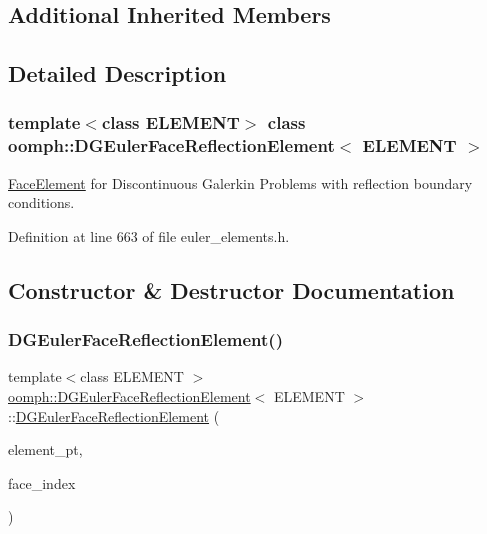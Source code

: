 \subsection*{Additional Inherited Members}


\subsection{Detailed Description}
\subsubsection*{template$<$class E\+L\+E\+M\+E\+NT$>$\newline
class oomph\+::\+D\+G\+Euler\+Face\+Reflection\+Element$<$ E\+L\+E\+M\+E\+N\+T $>$}

\hyperlink{classoomph_1_1FaceElement}{Face\+Element} for Discontinuous Galerkin Problems with reflection boundary conditions. 

Definition at line 663 of file euler\+\_\+elements.\+h.



\subsection{Constructor \& Destructor Documentation}
\mbox{\label{classoomph_1_1DGEulerFaceReflectionElement_abf3440cd3556c0d9f968dab2a4b90c24}} 
\subsubsection{\texorpdfstring{D\+G\+Euler\+Face\+Reflection\+Element()}{DGEulerFaceReflectionElement()}}
{\footnotesize\ttfamily template$<$class E\+L\+E\+M\+E\+NT $>$ \\
\hyperlink{classoomph_1_1DGEulerFaceReflectionElement}{oomph\+::\+D\+G\+Euler\+Face\+Reflection\+Element}$<$ E\+L\+E\+M\+E\+NT $>$\+::\hyperlink{classoomph_1_1DGEulerFaceReflectionElement}{D\+G\+Euler\+Face\+Reflection\+Element} (\begin{DoxyParamCaption}\item[{\hyperlink{classoomph_1_1FiniteElement}{Finite\+Element} $\ast$const \&}]{element\+\_\+pt,  }\item[{const int \&}]{face\+\_\+index }\end{DoxyParamCaption})\hspace{0.3cm}{\ttfamily [inline]}}



